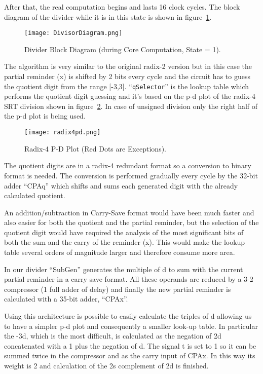 After that, the real computation begins and lasts 16 clock cycles. The block diagram of the divider
while it is in this state is shown in figure~\ref{fig:div_block_dia}.

\begin{figure}[H]
\centering
\texttt{[image: DivisorDiagram.png]}
\caption{Divider Block Diagram (during Core Computation, State = 1).}
\label{fig:div_block_dia}
\end{figure}

The algorithm is very similar to the original radix-2 version but in this case the partial reminder (x)
is shifted by 2 bits every cycle and the circuit has to guess the quotient digit from the range [-3,3].
``\texttt{qSelector}'' is the lookup table which performs the quotient digit guessing and it's based on the p-d
plot of the radix-4 SRT division shown in figure~\ref{fig:div_pd_plot}. In case of unsigned division only the right half of
the p-d plot is being used.

\begin{figure}[H]
\centering
\texttt{[image: radix4pd.png]}
\caption{Radix-4 P-D Plot (Red Dots are Exceptions).}
\label{fig:div_pd_plot}
\end{figure}

The quotient digits are in a radix-4 redundant format so a conversion to binary format is needed.
The conversion is performed gradually every cycle by the 32-bit adder ``CPAq'' which shifts and sums
each generated digit with the already calculated quotient.

An addition/subtraction in Carry-Save format would have been much faster and also easier for both the quotient and the partial reminder, but the selection of the quotient digit would have required the analysis of the most significant bits of
both the sum and the carry of the reminder (x). This would make the lookup table several orders of magnitude larger and therefore consume more area.

In our divider ``SubGen'' generates the multiple of d to sum with the current partial reminder in a
carry save format. All these operands are reduced by a 3-2 compressor (1 full adder of
delay) and finally the new partial reminder is calculated with a 35-bit adder, ``CPAx''.

Using this architecture is possible to easily calculate the triples of d allowing us to have a simpler p-d plot and consequently a smaller look-up table. In particular the -3d, which is the most difficult, is calculated as the negation of 2d concatenated with a 1 plus the negation of d. The signal t is set to 1 so it can be summed twice in the compressor and as the carry input of CPAx. In this way its weight is 2 and calculation of the 2s complement of 2d is finished.


